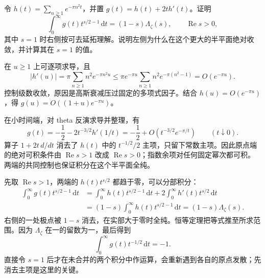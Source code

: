 \begin{exercise}\label{b3:ex:26-5}
令 \(h(t)=\sum_{n\ge1}e^{-\pi n^2t}\)，并置 \(g(t)=h(t)+2t h'(t)\)。证明
\[
 \int_0^\infty g(t)t^{s/2-1}\,\mathrm dt
 =(1-s)\Lambda_\zeta(s),\qquad\operatorname{Re}s>0,
\]
其中 \(s=1\) 时右侧按可去延拓理解。说明左侧为什么在这个更大的半平面绝对收敛，并计算其在 \(s=1\) 的值。
\end{exercise}
\begin{solution}
在 \(u\ge1\) 上可逐项求导，且
\[
 |h'(u)|=\pi\sum_{n\ge1}n^2e^{-\pi n^2u}
 \le\pi e^{-\pi u}\sum_{n\ge1}n^2e^{-\pi(n^2-1)}
 =O(e^{-\pi u}).
\]
控制级数收敛，原因是高斯衰减压过固定的多项式因子。结合 \(h(u)=O(e^{-\pi u})\)，得
\(g(u)=O((1+u)e^{-\pi u})\)。

在小时间端，对 theta 反演求导并整理，有
\[
 g(t)=-\frac12-2t^{-3/2}h'(1/t)
     =-\frac12+O(t^{-3/2}e^{-\pi/t})
     \qquad(t\downarrow0).
\]
算子 \(1+2t\,d/dt\) 消去了 \(h(t)\) 中的 \(t^{-1/2}/2\) 主项，只留下常数主项。因此原点端的绝对可积条件由 \(\operatorname{Re}s>1\) 改成 \(\operatorname{Re}s>0\)；指数余项对任何固定幂次都可积。两端的共同控制也保证积分在这个半平面全纯。

先取 \(\operatorname{Re}s>1\)，两端的 \(h(t)t^{s/2}\) 都趋于零，可以分部积分：
\[
 \begin{aligned}
 \int_0^\infty g(t)t^{s/2-1}\,\mathrm dt
 &=\int_0^\infty h(t)t^{s/2-1}\,\mathrm dt
       +2\int_0^\infty h'(t)t^{s/2}\,\mathrm dt\\
 &=(1-s)\int_0^\infty h(t)t^{s/2-1}\,\mathrm dt
  =(1-s)\Lambda_\zeta(s).
 \end{aligned}
\]
右侧的一处极点被 \(1-s\) 消去，在实部大于零时全纯。恒等定理把等式推至所求范围。因为 \(\Lambda_\zeta\) 在一的留数为一，最后得到
\[
 \int_0^\infty g(t)t^{-1/2}\,\mathrm dt=-1.
\]
直接令 \(s=1\) 后才在未合并的两个积分中作运算，会重新遇到各自的原点发散；先消去主项是这里的关键。
\end{solution}

